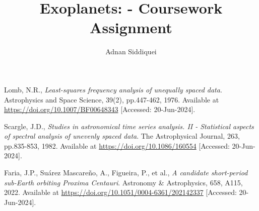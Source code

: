 \documentclass[a4paper,11pt]{article}
\title{\boldmath Exoplanets: - Coursework Assignment}
\author{Adnan Siddiquei}
\affiliation{University of Cambridge}
\newcommand{\inlinecode}[1]{\texttt{\seqsplit{#1}}}
\begin{document}
\maketitle
\flushbottom





\clearpage
\appendix


\begin{thebibliography}{99}

Lomb, N.R.,
\textit{Least-squares frequency analysis of unequally spaced data}.
Astrophysics and Space Science, 39(2), pp.447-462, 1976.
Available at \url{https://doi.org/10.1007/BF00648343} [Accessed: 20-Jun-2024].

Scargle, J.D.,
\textit{Studies in astronomical time series analysis. II - Statistical aspects of spectral analysis of unevenly spaced data}.
The Astrophysical Journal, 263, pp.835-853, 1982.
Available at \url{https://doi.org/10.1086/160554} [Accessed: 20-Jun-2024].

Faria, J.P., Suárez Mascareño, A., Figueira, P., et al.,
\textit{A candidate short-period sub-Earth orbiting Proxima Centauri}.
Astronomy \& Astrophysics, 658, A115, 2022.
Available at \url{https://doi.org/10.1051/0004-6361/202142337} [Accessed: 20-Jun-2024].


\end{thebibliography}
\end{document}
